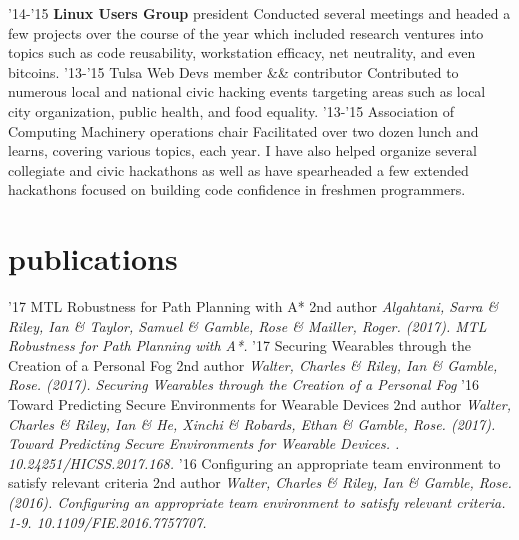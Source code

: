 \documentclass[print]{friggeri-cv}
\begin{document}
\begin{entrylist}
  \entry
    {'14-'15}
    {\textbf{Linux Users Group}}
    {president}
    {Conducted several meetings and headed a few projects over the course of the year which included research ventures into topics such as code reusability, workstation efficacy, net neutrality, and even bitcoins.}
  \entry
    {'13-'15}
    {Tulsa Web Devs}
    {member \&\& contributor}
    {Contributed to numerous local and national civic hacking events targeting areas such as local city organization, public health, and food equality.}
  \entry
    {'13-'15}
    {Association of Computing Machinery}
    {operations chair}
    {Facilitated over two dozen lunch and learns, covering various topics, each year. I have also helped organize several collegiate and civic hackathons as well as have spearheaded a few extended hackathons focused on building code confidence in freshmen programmers.}
\end{entrylist}

\section{publications}

\begin{entrylist}
  \entry
    {'17}
	{MTL Robustness for Path Planning with A*}
	{2nd author}
	{\textit{Algahtani, Sarra \& Riley, Ian \& Taylor, Samuel \& Gamble, Rose \& Mailler, Roger. (2017). MTL Robustness for Path Planning with A*.}}
  \entry
    {'17}
	{Securing Wearables through the Creation of a Personal Fog}
	{2nd author}
	{\textit{Walter, Charles \& Riley, Ian \& Gamble, Rose. (2017). Securing Wearables through the Creation of a Personal Fog}}
  \entry
	{'16}
	{Toward Predicting Secure Environments for Wearable Devices}
	{2nd author}
	{\textit{Walter, Charles \& Riley, Ian \& He, Xinchi \& Robards, Ethan \& Gamble, Rose. (2017). Toward Predicting Secure Environments for Wearable Devices. . 10.24251/HICSS.2017.168.}}
  \entry
	{'16}
	{Configuring an appropriate team environment to satisfy relevant criteria}
	{2nd author}
	{\textit{Walter, Charles \& Riley, Ian \& Gamble, Rose. (2016). Configuring an appropriate team environment to satisfy relevant criteria. 1-9. 10.1109/FIE.2016.7757707.}}
\end{entrylist}
\end{document}
